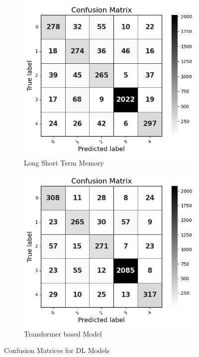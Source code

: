 \pagebreak

\begin{figure}[H]
    \centering
    \begin{subfigure}[b]{0.49\textwidth}
        \centering
        \includegraphics[width=\textwidth]{Images/LSTM Confusion Matrix.png}  
        \vspace{-0.8cm}
        \caption{Long Short Term Memory}
        \label{LSTMCM}  %
    \end{subfigure}
    \hfill
    \begin{subfigure}[b]{0.49\textwidth}
        \centering
        \includegraphics[width=\textwidth]{Images/T CM.png}
        \vspace{-0.8cm}
        \caption{Transformer based Model}
        \label{dfdl145}  %
    \end{subfigure}
    \label{fig:lstm_comparison}
    \vspace{-0.25cm}
    \caption{Confusion Matrices for DL Models}


\end{figure}
